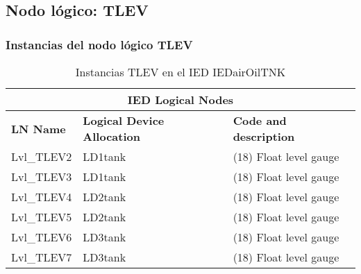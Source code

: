 
\subsection{Nodo l\'ogico: 			 TLEV}

    \subsubsection{Instancias del nodo l\'ogico TLEV}
    \begin{table}[H]
    \begin{center}
    \begin{tabular}{|l|l|p{6.8cm}|}
            \hline
            \multicolumn{3}{|c|}{\cellcolor[gray]{0.8} \textbf{IED Logical Nodes} } \\
            \hline
            \textbf{LN Name} & \textbf{Logical Device Allocation} & \textbf{Code and description} \\
            \hline
            Lvl\_TLEV2 & LD1tank & (18) Float level gauge \\
            \hline
            Lvl\_TLEV3 & LD1tank & (18) Float level gauge \\
            \hline
            Lvl\_TLEV4 & LD2tank & (18) Float level gauge \\
            \hline
            Lvl\_TLEV5 & LD2tank & (18) Float level gauge \\
            \hline
            Lvl\_TLEV6 & LD3tank & (18) Float level gauge \\
            \hline
            Lvl\_TLEV7 & LD3tank & (18) Float level gauge \\
            \hline
    \end{tabular}
    \caption{Instancias TLEV en el IED IEDairOilTNK}
    \label{table:lnInstTLEV_gauge}
    \end{center}
    \end{table}
    
    
    
